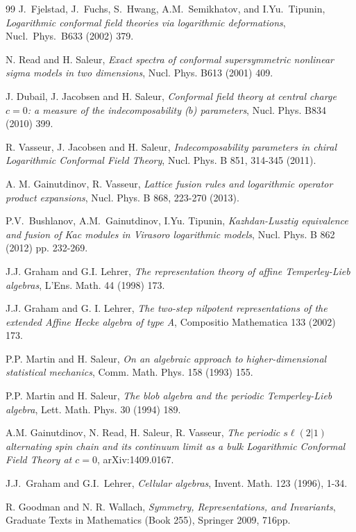 \documentclass[11pt]{article}
\theoremstyle{definition}
\begin{document}
\begin{thebibliography}{99}
\bibitem{[FFHST]} J.~Fjelstad, J.~Fuchs, S.~Hwang, A.M.~Semikhatov,
  and I.Yu.~Tipunin, \textit{Logarithmic conformal field theories via
    logarithmic deformations}, Nucl.\ Phys.\ B633 (2002) 379.

 N. Read and H. Saleur,  \textit{Exact spectra of conformal supersymmetric nonlinear sigma models
in two dimensions}, Nucl. Phys. B613 (2001) 409.

 J. Dubail, J. Jacobsen and H. Saleur,
  \textit{Conformal field theory at central charge $c=0$: a measure of
    the indecomposability ($b$) parameters}, Nucl. Phys. B834 (2010) 399.

 R. Vasseur, J. Jacobsen and H. Saleur, \textit{Indecomposability parameters in chiral Logarithmic Conformal Field Theory},  Nucl. Phys. B 851,  314-345 (2011).

\bibitem{[GV]} A. M. Gainutdinov, R. Vasseur,
\textit{Lattice fusion rules and logarithmic operator product expansions},  Nucl. Phys. B 868, 223-270 (2013).

 P.V.~Bushlanov, A.M.~Gainutdinov,   I.Yu. Tipunin,
  \textit{Kazhdan-Lusztig equivalence and fusion of Kac modules in
    Virasoro logarithmic models}, Nucl. Phys. B 862 (2012) pp. 232-269.

 J.J. Graham and G.I. Lehrer,  \textit{The representation
theory of affine Temperley-Lieb algebras}, L'Ens. Math. 44 (1998) 173.

 J.J. Graham and G. I. Lehrer,  \textit{The two-step
nilpotent representations of the extended Affine Hecke algebra of type
A}, Compositio Mathematica 133 (2002) 173.

 P.P. Martin and H. Saleur, \textit{On an
  algebraic approach to higher-dimensional statistical mechanics}, Comm. Math. Phys. 158 (1993) 155.

 P.P. Martin and H. Saleur,  \textit{The blob algebra
and the periodic Temperley-Lieb algebra}, Lett. Math. Phys. 30 (1994) 189.

 A.M. Gainutdinov, N. Read, H. Saleur, R. Vasseur, \textit{The periodic $s\ell(2|1)$ alternating spin chain and its continuum limit as a bulk Logarithmic Conformal Field Theory at $c=0$}, arXiv:1409.0167.

 J.J.~Graham and G.I.~Lehrer, \textit{Cellular algebras},
  Invent. Math. 123 (1996), 1-34.


 R. Goodman and N. R. Wallach, \textit{Symmetry, Representations,
and Invariants}, Graduate Texts in Mathematics (Book 255), Springer 2009, 716pp.


\end{thebibliography}
\end{document}
